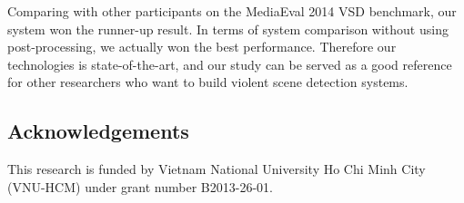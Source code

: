 \documentclass[twocolumn]{bmcart}%
\begin{document}
Comparing with other participants on the MediaEval 2014 VSD benchmark, our system won the runner-up result. In terms of system comparison without using post-processing, we actually won the best performance. Therefore our technologies is state-of-the-art, and our study can be served as a good reference for other researchers who want to build violent scene detection systems. 



\begin{backmatter}

\section{Acknowledgements}
This research is funded by Vietnam National University Ho Chi Minh City (VNU-HCM) under grant number B2013-26-01.









\end{backmatter}
\end{document}
